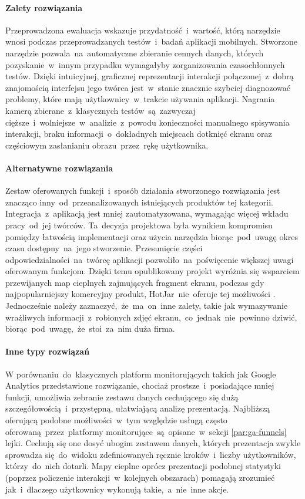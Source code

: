 \paragraph{Zalety rozwiązania}
Przeprowadzona ewaluacja wskazuje przydatność~i~wartość, którą narzędzie wnosi podczas przeprowadzanych testów~i~badań aplikacji mobilnych. Stworzone narzędzie pozwala~na~automatyczne zbieranie cennych danych, których pozyskanie~w~innym przypadku wymagałyby zorganizowania czasochłonnych testów. Dzięki intuicyjnej, graficznej reprezentacji interakcji połączonej~z~dobrą znajomością interfejsu jego twórca jest~w~stanie znacznie szybciej diagnozować problemy, które mają użytkownicy~w~trakcie używania aplikacji. Nagrania kamerą zbierane~z~klasycznych testów~są~zazwyczaj cięższe~i~wolniejsze~w~analizie~z~powodu konieczności manualnego spisywania interakcji, braku informacji~o~dokładnych miejscach dotknięć ekranu oraz częściowym zasłanianiu obrazu~przez~rękę użytkownika. 

\paragraph{Alternatywne rozwiązania}
Zestaw oferowanych funkcji~i~sposób działania stworzonego rozwiązania jest znacząco inny~od~przeanalizowanych istniejących produktów tej kategorii. Integracja~z~aplikacją jest mniej zautomatyzowana, wymagając więcej wkładu pracy~od~jej twórców. Ta~decyzja projektowa była wynikiem kompromisu pomiędzy łatwością implementacji oraz użycia narzędzia biorąc~pod~uwagę okres czasu dostępny~na~jego stworzenie. Przesunięcie części odpowiedzialności~na~twórcę aplikacji pozwoliło~na~poświęcenie większej uwagi oferowanym funkcjom. Dzięki temu opublikowany projekt wyróżnia się wsparciem przewijanych map cieplnych zajmujących fragment ekranu, podczas gdy najpopularniejszy komercyjny produkt, HotJar~nie~oferuje tej możliwości \cite{Hotjar_limitations}. Jednocześnie należy zaznaczyć,~że~ma~on~inne zalety, takie jak wymazywanie wrażliwych informacji~z~robionych zdjęć ekranu,~co~jednak~nie~powinno dziwić, biorąc~pod~uwagę,~że~stoi~za~nim duża firma.

\paragraph{Inne typy rozwiązań}
W porównaniu~do~klasycznych platform monitorujących takich jak Google Analytics przedstawione rozwiązanie, chociaż prostsze~i~posiadające mniej funkcji, umożliwia zebranie zestawu danych cechującego się dużą szczegółowością~i~przystępną, ułatwiającą analizę prezentacją. Najbliższą oferującą podobne możliwości~w~tym względzie usługą często oferowaną~przez~platformy monitorujące~są~opisane~w~sekcji \ref{par:ga-funnels} lejki. Cechują się one dosyć  ubogim zestawem danych, których prezentacja zwykle sprowadza się~do~widoku zdefiniowanych ręcznie kroków~i~liczby użytkowników, którzy~do~nich dotarli. Mapy cieplne oprócz prezentacji podobnej statystyki (poprzez policzenie interakcji~w~kolejnych obszarach) pomagają zrozumieć jak~i~dlaczego użytkownicy wykonują takie,~a~nie~inne akcje.
